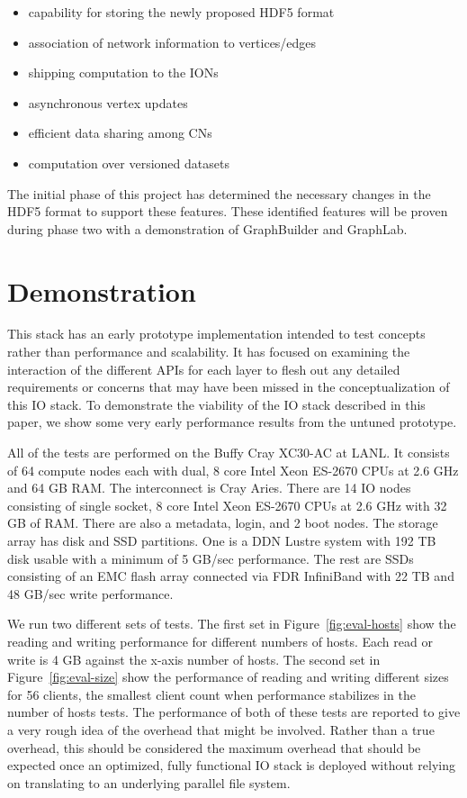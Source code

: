 \documentclass[conference]{IEEEtran} \pdfpagewidth=8.5in
\begin{document}
\begin{itemize}
\item
  capability for storing the newly proposed HDF5 format
\item
  association of network information to vertices/edges
\item
  shipping computation to the IONs
\item
  asynchronous vertex updates
\item
  efficient data sharing among CNs
\item
  computation over versioned datasets
\end{itemize}

The initial phase of this project has determined the necessary changes in the
HDF5 format to support these features. These identified features will be
proven during phase two with a demonstration of GraphBuilder and GraphLab.

\section{Demonstration}
\label{sec:evaluation}

This stack has an early prototype implementation intended to test concepts
rather than performance and scalability. It has focused on examining the
interaction of the different APIs for each layer to flesh out any detailed
requirements or concerns that may have been missed in the conceptualization of
this IO stack. To demonstrate the viability of the IO stack described in this
paper, we show some very early performance results from the untuned prototype.

All of the tests are performed on the Buffy Cray XC30-AC at LANL.  It consists
of 64 compute nodes each with dual, 8 core Intel Xeon ES-2670 CPUs at 2.6 GHz
and 64 GB RAM.  The interconnect is Cray Aries. There are 14 IO nodes
consisting of single socket, 8 core Intel Xeon ES-2670 CPUs at 2.6 GHz with 32
GB of RAM.  There are also a metadata, login, and 2 boot nodes.  The storage
array has disk and SSD partitions. One is a DDN Lustre system with 192 TB disk
usable with a minimum of 5 GB/sec performance. The rest are SSDs consisting of
an EMC flash array connected via FDR InfiniBand with 22 TB and 48 GB/sec write
performance.

We run two different sets of tests. The first set in
Figure~\ref{fig:eval-hosts} show the reading and writing performance for
different numbers of hosts. Each read or write is 4 GB against the x-axis
number of hosts. The second set in Figure~\ref{fig:eval-size} show the
performance of reading and writing different sizes for 56 clients, the smallest
client count when performance stabilizes in the number of hosts tests.  The
performance of both of these tests are reported to give a very rough idea of
the overhead that might be involved. Rather than a true overhead, this should
be considered the maximum overhead that should be expected once an optimized,
fully functional IO stack is deployed without relying on translating to an
underlying parallel file system. 
\end{document}
